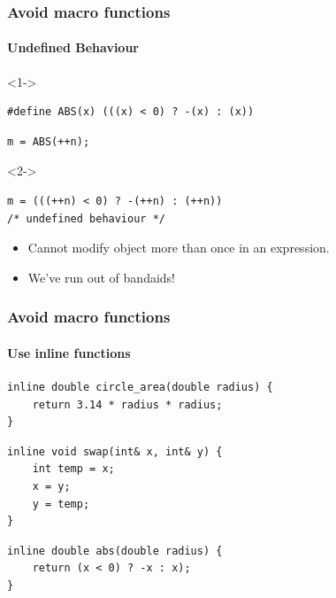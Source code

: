 \documentclass[table]{beamer}
\newcounter{rulecount}
\newcommand{\declarerule}{\textbf{\color{themeblue}{Rule \therulecount:}} }
\begin{document}
\begin{frame}[fragile]
    \frametitle{\declarerule Avoid macro functions}
    \framesubtitle{Undefined Behaviour}
    
\begin{uncoverenv}<1->
\begin{lstlisting}[title=A simple abs macro]
#define ABS(x) (((x) < 0) ? -(x) : (x))
\end{lstlisting}

\begin{lstlisting}[title=You write]
m = ABS(++n); 
\end{lstlisting}
\end{uncoverenv}

\begin{uncoverenv}<2->
\begin{lstlisting}[title=The compiler sees]
m = (((++n) < 0) ? -(++n) : (++n))
/* undefined behaviour */
\end{lstlisting}
    \begin{itemize}
        \item Cannot modify object more than once in an expression.
        \item We've run out of bandaids!
    \end{itemize}
\end{uncoverenv}
\end{frame}

\begin{frame}[fragile]
    \frametitle{\declarerule Avoid macro functions}
    \framesubtitle{Use inline functions}
\begin{lstlisting}[title=\textbf{Better solution:} inline functions]
inline double circle_area(double radius) {
    return 3.14 * radius * radius;
}
\end{lstlisting}

\begin{lstlisting}
inline void swap(int& x, int& y) {
    int temp = x;
    x = y;
    y = temp;
}
\end{lstlisting}

\begin{lstlisting}
inline double abs(double radius) {
    return (x < 0) ? -x : x);
}
\end{lstlisting}

\end{frame}
\end{document}
